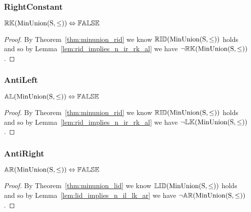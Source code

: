 \documentclass[../Summary.tex]{subfiles}
\begin{document}
\subsubsection{RightConstant}

\begin{theorem} \label{thm:minunion_rk}
${\mathbb{RK}}(\mathrm{MinUnion(S,\leq)}) \Leftrightarrow {\mathbb{FALSE}}$
\end{theorem}

\begin{proof}

\vspace{0.5em}

By Theorem~\ref{thm:minunion_rid} we know ${\mathbb{RID}}(\mathrm{MinUnion(S,\leq)})$ holds and so by Lemma~\ref{lem:rid_implies_n_ir_rk_al} we have $\neg {\mathbb{RK}}(\mathrm{MinUnion(S,\leq)})$.
\end{proof}





\subsubsection{AntiLeft}

\begin{theorem} \label{thm:minunion_al}
${\mathbb{AL}}(\mathrm{MinUnion(S,\leq)}) \Leftrightarrow {\mathbb{FALSE}}$
\end{theorem}

\begin{proof}

\vspace{0.5em}

By Theorem~\ref{thm:minunion_rid} we know ${\mathbb{RID}}(\mathrm{MinUnion(S,\leq)})$ holds and so by Lemma~\ref{lem:rid_implies_n_ir_rk_al} we have $\neg {\mathbb{LK}}(\mathrm{MinUnion(S,\leq)})$.
\end{proof}




\subsubsection{AntiRight}

\begin{theorem} \label{thm:minunion_ar}
${\mathbb{AR}}(\mathrm{MinUnion(S,\leq)}) \Leftrightarrow {\mathbb{FALSE}}$
\end{theorem}

\begin{proof}

\vspace{0.5em}

By Theorem~\ref{thm:minunion_lid} we know ${\mathbb{LID}}(\mathrm{MinUnion(S,\leq)})$ holds and so by Lemma~\ref{lem:lid_implies_n_il_lk_ar} we have $\neg {\mathbb{AR}}(\mathrm{MinUnion(S,\leq)})$.
\end{proof}
\end{document}
